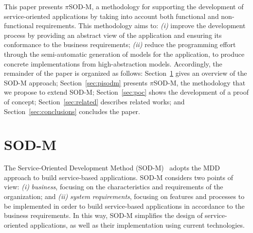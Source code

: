 \documentclass{llncs}
\theoremstyle{plain}
\theoremstyle{plain}
\theoremstyle{plain}
\begin{document}
%


This paper presents $\pi$SOD-M,  a methodology for supporting the development of service-oriented applications by taking into account both functional and non-functional requirements. This methodology aims to:
\textit{(i)} improve the development process by providing an abstract view of the application and ensuring its conformance to the business requirements;
\textit{(ii)} reduce the programming effort through the semi-automatic generation of  models for the application, to produce concrete implementations from high-abstraction models.
%
Accordingly, the remainder of the paper is organized as follows:
Section~\ref{sec:sodm}  gives an overview of the SOD-M approach;
Section~\ref{sec:pisodm} presents $\pi$SOD-M, the methodology that we propose to extend SOD-M;
Section~\ref{sec:poc} shows the development of a proof of concept;
Section~\ref{sec:related} describes related works; and
Section~\ref{sec:conclusions} concludes the paper. %


\section{SOD-M}\label{sec:sodm}
%

The Service-Oriented Development Method (SOD-M)~\cite{decastro1}
adopts  the MDD approach to build service-based applications. SOD-M considers two points of view:
\textit{(i)} \textit{business}, focusing on the characteristics and requirements
of the organization; and 
\textit{(ii)} \textit{system requirements}, focusing on
features and processes to be implemented in order to build service-based applications in accordance to the business requirements. In
this way, SOD-M  simplifies the design of service-oriented applications, as
well as their implementation using current technologies.
\end{document}
